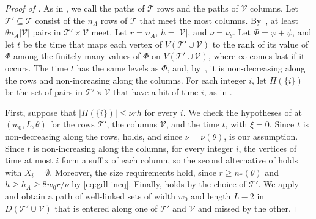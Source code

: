 \documentclass[fontsize=12pt,leading=14pt]{fullpaper}
\newcommand{\Tcal}{\mathcal{T}}
\newcommand{\Vcal}{\mathcal{V}}
\begin{document}
\begin{proof}[Proof of ]
  As in , we call the paths of $\Tcal$ rows and the paths of $\Vcal$ columns.
  Let $\Tcal'\subseteq\Tcal$ consist of the $n_A$ rows of $\Tcal$ that meet the most columns.
  By~, at least $\theta n_A|\Vcal|$ pairs in $\Tcal'\times\Vcal$ meet.
  Let $r=n_A$, $h=|\Vcal|$, and $\nu=\nu_\theta$.
  Let $\Phi=\varphi+\psi$, and let $t$ be the time that maps each vertex of $V(\Tcal'\cup\Vcal)$ to the rank of its value of $\Phi$ among the finitely many values of $\Phi$ on $V(\Tcal'\cup\Vcal)$, where $\infty$ comes last if it occurs.
  The time $t$ has the same levels as $\Phi$, and, by~, it is non-decreasing along the rows and non-increasing along the columns.
  For each integer $i$, let $\Pi(\{i\})$ be the set of pairs in $\Tcal'\times\Vcal$ that have a hit of time $i$, as in .

  First, suppose that $|\Pi(\{i\})|\le\nu rh$ for every $i$.
  We check the hypotheses of  at $(w_0,L,\theta)$ for the rows $\Tcal'$, the columns $\Vcal$, and the time $t$, with $\xi=0$.
  Since $t$ is non-decreasing along the rows,  holds, and since $\nu=\nu(\theta)$,  is our assumption.
  Since $t$ is non-increasing along the columns, for every integer $i$, the vertices of time at most $i$ form a suffix of each column, so the second alternative of  holds with $X_i=\emptyset$.
  Moreover, the size requirements  hold, since $r\ge n_*(\theta)$ and $h\ge h_A\ge8w_0r/\nu$ by \eqref{eq:gdl-ineq}.
  Finally,  holds by the choice of $\Tcal'$.
  We apply  and obtain a path of well-linked sets of width $w_0$ and length $L-2$ in $D(\Tcal'\cup\Vcal)$ that is entered along one of $\Tcal'$ and $\Vcal$ and missed by the other.


\end{proof}
\end{document}
